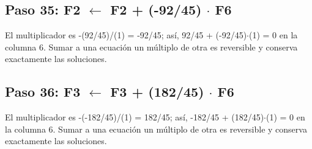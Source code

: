 \documentclass[conference]{IEEEtran}
\begin{document}

\medskip
\subsection*{Paso 35: F2 \(\leftarrow\) F2 + (-92/45) \(\cdot\) F6}
El multiplicador es -(92/45)/(1) = -92/45; así, 92/45 + (-92/45)\(\cdot\)(1) = 0 en la columna 6. Sumar a una ecuación un múltiplo de otra es reversible y conserva exactamente las soluciones.


\medskip
\subsection*{Paso 36: F3 \(\leftarrow\) F3 + (182/45) \(\cdot\) F6}
El multiplicador es -(-182/45)/(1) = 182/45; así, -182/45 + (182/45)\(\cdot\)(1) = 0 en la columna 6. Sumar a una ecuación un múltiplo de otra es reversible y conserva exactamente las soluciones.

\end{document}
